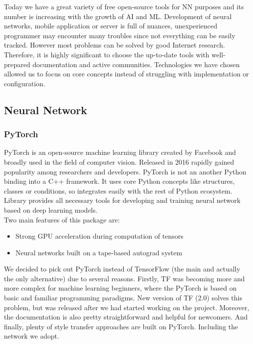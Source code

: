 \documentclass[../Main.tex]{subfiles}
\begin{document}
Today we have a great variety of free open-source tools for NN purposes and its number is increasing with the growth of AI and ML. Development of neural networks, mobile application or server is full of nuances, unexperienced programmer may encounter many troubles since not everything can be easily tracked. However most problems can be solved by good Internet research. Therefore, it is highly significant to choose the up-to-date tools with well-prepared documentation and active communities. Technologies we have chosen allowed us to focus on core concepts instead of struggling with implementation or configuration.

\subsection{Neural Network}

    \subsubsection{PyTorch}
        PyTorch is an open-source machine learning library created by Facebook and broadly used in the field of computer vision. Released in 2016 rapidly gained popularity among researchers and developers. PyTorch is not an another Python binding into a C++ framework. It uses core Python concepts like structures, classes or conditions, so integrates easily with the rest of Python ecosystem. Library provides all necessary tools for developing and training neural network based on deep learning models. \\ 
        Two main features of this package are:
        \begin{itemize}
            \item Strong GPU acceleration during computation of tensors
            \item Neural networks built on a tape-based autograd system
        \end{itemize}
        
        We decided to pick out PyTorch instead of TensorFlow (the main and actually the only alternative) due to several reasons. Firstly, TF was becoming more and more complex for machine learning beginners, where the PyTorch is based on basic and familiar programming paradigms. New version of TF (2.0) solves this problem, but was released after we had started working on the project. Moreover, the documentation is also pretty straightforward and helpful for newcomers. And finally, plenty of style transfer approaches are built on PyTorch. Including the network we adopt. 
        
\end{document}
